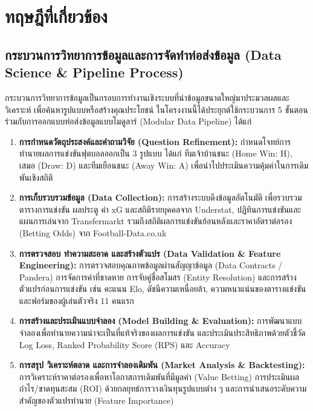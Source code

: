 
\section{ทฤษฎีที่เกี่ยวข้อง}

\subsection{กระบวนการวิทยาการข้อมูลและการจัดทำท่อส่งข้อมูล (Data Science \& Pipeline Process)}

กระบวนการวิทยาการข้อมูลเป็นกรอบการทำงานเชิงระบบที่นำข้อมูลขนาดใหญ่มาประมวลผลและวิเคราะห์ เพื่อค้นหารูปแบบหรือสร้างคุณประโยชน์ ในโครงงานนี้ได้ประยุกต์ใช้กระบวนการ 5 ขั้นตอน ร่วมกับการออกแบบท่อส่งข้อมูลแบบโมดูลาร์ (Modular Data Pipeline) ได้แก่

\begin{enumerate}[label=\arabic*)]
    \item \textbf{การกำหนดวัตถุประสงค์และคำถามวิจัย (Question Refinement):} กำหนดโจทย์การทำนายผลการแข่งขันฟุตบอลออกเป็น 3 รูปแบบ ได้แก่ ทีมเจ้าบ้านชนะ (Home Win: H), เสมอ (Draw: D) และทีมเยือนชนะ (Away Win: A) เพื่อนำไปประเมินความคุ้มค่าในการเดิมพันเชิงสถิติ
    \item \textbf{การเก็บรวบรวมข้อมูล (Data Collection):} การสร้างระบบดึงข้อมูลอัตโนมัติ เพื่อรวบรวมตารางการแข่งขัน ผลประตู ค่า xG และสถิติรายบุคคลจาก Understat, ปฏิทินการแข่งขันและแผนการเล่นจาก Transfermarkt รวมถึงสถิติผลการแข่งขันย้อนหลังและราคาอัตราต่อรอง (Betting Odds) จาก Football-Data.co.uk \cite{footballdata, transfermarkt2024, understat2024}
    \item \textbf{การตรวจสอบ ทำความสะอาด และสร้างตัวแปร (Data Validation \& Feature Engineering):} การตรวจสอบคุณภาพข้อมูลผ่านสัญญาข้อมูล (Data Contracts / Pandera) การจัดการค่าที่ขาดหาย การจับคู่ชื่อสโมสร (Entity Resolution) และการสร้างตัวแปรก่อนการแข่งขัน เช่น คะแนน Elo, ดัชนีความเหนื่อยล้า, ความหนาแน่นของตารางแข่งขัน และฟอร์มของผู้เล่นตัวจริง 11 คนแรก
    \item \textbf{การสร้างและประเมินแบบจำลอง (Model Building \& Evaluation):} การพัฒนาแบบจำลองเพื่อทำนายความน่าจะเป็นที่แท้จริงของผลการแข่งขัน และประเมินประสิทธิภาพด้วยตัวชี้วัด Log Loss, Ranked Probability Score (RPS) และ Accuracy \cite{scikit-learn}
    \item \textbf{การสรุป วิเคราะห์ตลาด และการจำลองเดิมพัน (Market Analysis \& Backtesting):} การวิเคราะห์ราคาต่อรองเพื่อหาโอกาสการเดิมพันที่มีมูลค่า (Value Betting) การประเมินผลกำไร/ขาดทุนสะสม (ROI) ด้วยกลยุทธ์การวางเงินทุนรูปแบบต่าง ๆ และการนำเสนอระดับความสำคัญของตัวแปรทำนาย (Feature Importance)
\end{enumerate}

